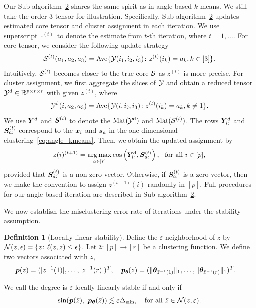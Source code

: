 \documentclass[lettersize,onecolumn,journal]{IEEEtran}
\theoremstyle{definition}
\theoremstyle{definition}
\newtheorem{defn}{Definition}
\newcommand{\of}[1]{\left(#1\right)}
\begin{document}
Our Sub-algorithm~\hyperref[alg:main]{2} shares the same spirit as in angle-based $k$-means. We still take the order-3 tensor for illustration. Specifically, Sub-algorithm~\hyperref[alg:main]{2} updates estimated core tensor and cluster assignment in each iteration. We use superscript $\cdot^{(t)}$ to denote the estimate from $t$-th iteration, where $t=1,\ldots.$ For core tensor, we consider the following update strategy  
 \[
 \mathcal{S}^{(t)}(a_1,a_2,a_3)=\text{Ave}\{\mathcal{Y}(i_1,i_2,i_3)\colon z^{(t)}(i_k)=a_k, k\in[3]\}.
\]
Intuitively, $\mathcal{S}^{(t)}$ becomes closer to the true core $\mathcal{S}$ as $z^{(t)}$ is more precise. For cluster assignment, we first aggregate the slices of $\mathcal{Y}$ and obtain a reduced tensor $\mathcal{Y}^{\text{d}}\in \mathbb{R}^{p \times r \times r}$ with given $z^{(t)}$, where
\[
\mathcal{Y}^{\text{d}}(i,a_2,a_3)=\text{Ave}\{\mathcal{Y}(i,i_2,i_3)\colon z^{(t)}(i_k)=a_k, k \neq 1\}.
\]
We use $\bm Y^d$ and $ \bm S^{(t)}$ to denote the $\text{Mat}(\mathcal{Y}^{\text{d}})$ and $\text{Mat}(\mathcal{S}^{(t)})$. The rows $\bm Y^d_{i:}$ and $\bm S^{(t)}_{a:}$ correspond to the $\bm x_i$ and $\bm{s}_a$ in the one-dimensional clustering~\eqref{eq:angle_kmeans}. Then, we obtain the updated assignment by
\[
z(i)^{(t+1)} = \argmax_{a \in [r]} \cos \of{ \mY^{\text{d}}_{i:}, \mS^{(t)}_{a:} },\ \text{ for all } i \in [p],
\]
provided that $\bm S^{(t)}_{a:}$ is a non-zero vector. Otherwise, if $\bm S^{(t)}_{a:}$ is a zero vector, then we make the convention to assign $z^{(t+1)}(i)$ randomly in $[p]$. Full procedures for our angle-based iteration are described in Sub-algorithm~\hyperref[alg:main]{2}. 

We now establish the misclustering error rate of iterations under the stability assumption.

\begin{defn}[Locally linear stability] \label{def:stable}
Define the $\varepsilon$-neighborhood of $z$ by $\mathcal{N}(z,\epsilon)=\{\bar z\colon \ell(\bar z, z)\leq \epsilon\}$. Let $\bar z\colon[p]\to [r]$ be a clustering function. We define two vectors associated with $\bar z$,
\begin{align}
    &\bm{p}(\bar z)=(|\bar z^{-1}(1)|, \ldots,|\bar z^{-1}(r)|)^T, \quad \bm{p}_{\boldsymbol{\theta}}(\bar z)=(\lVert\boldsymbol{\theta}_{\bar z^{-1}(1)}\rVert_1,\ldots,\lVert\boldsymbol{\theta}_{\bar z^{-1}(r)}\rVert_1)^T.
\end{align}

We call the degree is $\varepsilon$-locally linearly stable if and only if 
\begin{equation}\label{eq:local}
    \sin(\mp(\bar z),\ \mp_{\mtheta}(\bar z))\lesssim \varepsilon \Delta_{\min} ,\quad \text{for all } \bar z\in \tN(z, \varepsilon).
\end{equation}
\end{defn}
\end{document}
